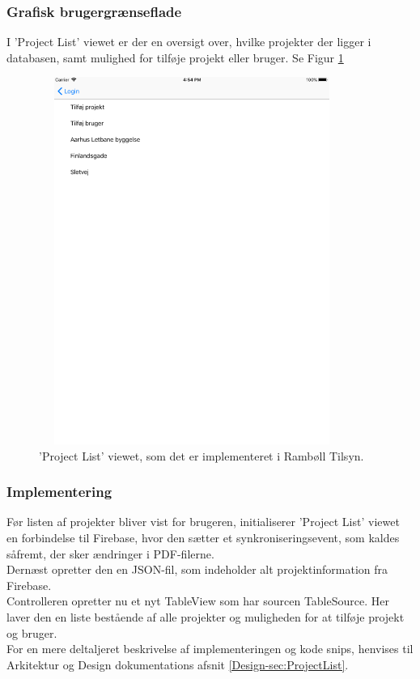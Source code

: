 \subsubsection{Grafisk brugergrænseflade}
I 'Project List' viewet er der en oversigt over, hvilke projekter der ligger i databasen, samt mulighed for tilføje projekt eller bruger. Se Figur \ref{fig:ProjectListView}
\begin{figure}[H] %
	\centering
	\includegraphics[height=12cm, width=10cm]{Design/Applikation/ProjektList/ProjectList}
	\caption{'Project List' viewet, som det er implementeret i Rambøll Tilsyn.}
	\label{fig:ProjectListView}
\end{figure}

\subsubsection{Implementering}
Før listen af projekter bliver vist for brugeren, initialiserer 'Project List' viewet en forbindelse til Firebase, hvor den sætter et synkroniseringsevent, som kaldes såfremt, der sker ændringer i PDF-filerne. \\
Dernæst opretter den en JSON-fil, som indeholder alt projektinformation fra Firebase. \\
Controlleren opretter nu et nyt TableView som har sourcen TableSource. Her laver den en liste bestående af alle projekter og muligheden for at tilføje projekt og bruger. \\
For en mere deltaljeret beskrivelse af implementeringen og kode snips, henvises til Arkitektur og Design dokumentations afsnit \ref{Design-sec:ProjectList}.

\clearpage